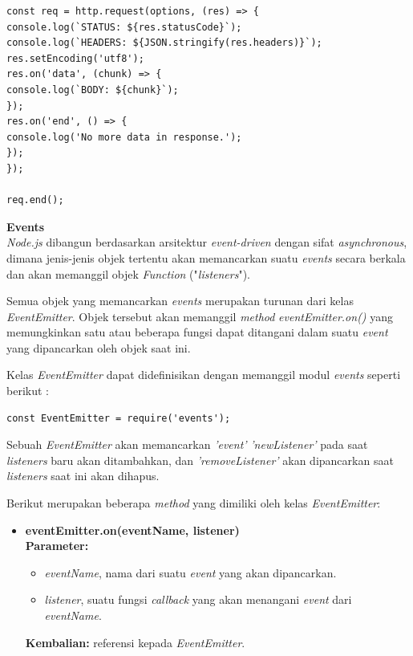 \documentclass[a4paper,twoside]{article}
\begin{document}
\begin{enumerate}
\begin{enumerate}
\begin{itemize}
\begin{lstlisting}
const req = http.request(options, (res) => {
console.log(`STATUS: ${res.statusCode}`);
console.log(`HEADERS: ${JSON.stringify(res.headers)}`);
res.setEncoding('utf8');
res.on('data', (chunk) => {
console.log(`BODY: ${chunk}`);
});
res.on('end', () => {
console.log('No more data in response.');
});
});
				
req.end();
\end{lstlisting}	
			\end{itemize}
			
			\textbf{Events} \\
			\textit{Node.js} dibangun berdasarkan arsitektur \textit{event-driven} dengan sifat \textit{asynchronous}, dimana jenis-jenis objek tertentu akan memancarkan suatu \textit{events} secara berkala dan akan memanggil objek \textit{Function} ("\textit{listeners}").
			
			Semua objek yang memancarkan \textit{events} merupakan turunan dari kelas \textit{EventEmitter}. Objek tersebut akan memanggil \textit{method} \textit{eventEmitter.on()} yang memungkinkan satu atau beberapa fungsi dapat ditangani dalam suatu \textit{event} yang dipancarkan oleh objek saat ini.
			
			Kelas \textit{EventEmitter} dapat didefinisikan dengan memanggil modul \textit{events} seperti berikut :
			
\begin{lstlisting}
const EventEmitter = require('events');
\end{lstlisting}
			
			Sebuah \textit{EventEmitter} akan memancarkan \textit{'event'} \textit{'newListener'} pada saat \textit{listeners} baru akan ditambahkan, dan \textit{'removeListener'} akan dipancarkan saat \textit{listeners} saat ini akan dihapus.
			
			Berikut merupakan beberapa \textit{method} yang dimiliki oleh kelas \textit{EventEmitter}:
			
			\begin{itemize}
				\item \textbf{eventEmitter.on(eventName, listener)} \\ \textbf{Parameter:}
				\begin{itemize}
					\item \textit{eventName}, nama dari suatu \textit{event} yang akan dipancarkan.
					\item \textit{listener}, suatu fungsi \textit{callback} yang akan menangani \textit{event} dari \textit{eventName}. 
				\end{itemize} 
				\textbf{Kembalian:} referensi kepada \textit{EventEmitter}.
				

\end{itemize}
\end{enumerate}
\end{enumerate}
\end{document}
